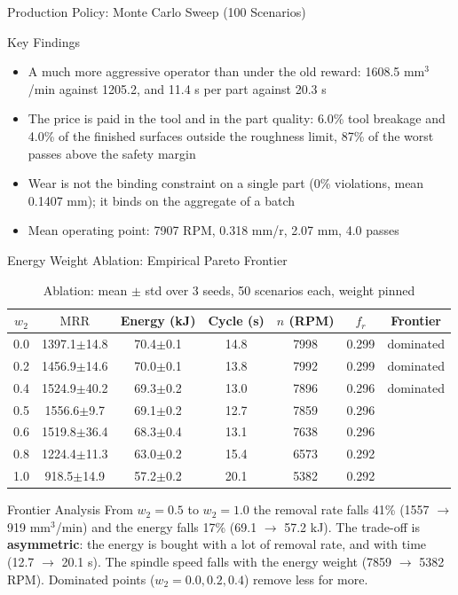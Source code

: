 ﻿\documentclass[11pt,aspectratio=169]{beamer}
\newcommand{\MRR}{\mathrm{MRR}}
\newcommand{\CMark}{\ding{51}}
\begin{document}
\begin{frame}{Production Policy: Monte Carlo Sweep (100 Scenarios)}
    \vspace{0em}
    \begin{block}{Key Findings}
    \scriptsize
    \begin{itemize}
        \item A much more aggressive operator than under the old reward: 1608.5 mm$^3$/min against 1205.2, and 11.4 s per part against 20.3 s
        \item The price is paid in the tool and in the part quality: \alert{6.0\% tool breakage} and 4.0\% of the finished surfaces outside the roughness limit, 87\% of the worst passes above the safety margin
        \item Wear is not the binding constraint on a single part (0\% violations, mean 0.1407 mm); it binds on the aggregate of a batch
        \item Mean operating point: 7907 RPM, 0.318 mm/r, 2.07 mm, 4.0 passes
    \end{itemize}
    \end{block}
\end{frame}
\begin{frame}{Energy Weight Ablation: Empirical Pareto Frontier}
    \small
    \begin{table}
    \centering
    \scriptsize
    \caption{Ablation: mean $\pm$ std over 3 seeds, 50 scenarios each, weight pinned}
    \begin{tabular}{@{}ccccccc@{}}
    \toprule
    $w_2$ & $\MRR$ & Energy (kJ) & Cycle (s) & $n$ (RPM) & $f_r$ & Frontier \\
    \midrule
    0.0 & 1397.1$\pm$14.8 & 70.4$\pm$0.1 & 14.8 & 7998 & 0.299 & dominated \\
    0.2 & 1456.9$\pm$14.6 & 70.0$\pm$0.1 & 13.8 & 7992 & 0.299 & dominated \\
    0.4 & 1524.9$\pm$40.2 & 69.3$\pm$0.2 & 13.0 & 7896 & 0.296 & dominated \\
    0.5 & 1556.6$\pm$9.7 & 69.1$\pm$0.2 & 12.7 & 7859 & 0.296 & \CMark \\
    0.6 & 1519.8$\pm$36.4 & 68.3$\pm$0.4 & 13.1 & 7638 & 0.296 & \CMark \\
    0.8 & 1224.4$\pm$11.3 & 63.0$\pm$0.2 & 15.4 & 6573 & 0.292 & \CMark \\
    1.0 & 918.5$\pm$14.9 & 57.2$\pm$0.2 & 20.1 & 5382 & 0.292 & \CMark \\
    \bottomrule
    \end{tabular}
    \end{table}

    \vspace{0.4em}
    \begin{alertblock}{Frontier Analysis}
    From $w_2 = 0.5$ to $w_2 = 1.0$ the removal rate falls \alert{41\%} (1557 $\to$ 919 mm$^3$/min)
    and the energy falls \alert{17\%} (69.1 $\to$ 57.2 kJ). The trade-off is \textbf{asymmetric}: the
    energy is bought with a lot of removal rate, and with time (12.7 $\to$ 20.1 s). The spindle speed
    falls with the energy weight (7859 $\to$ 5382 RPM). Dominated points ($w_2 = 0.0, 0.2, 0.4$) remove
    less for more.
    \end{alertblock}
\end{frame}
\end{document}

